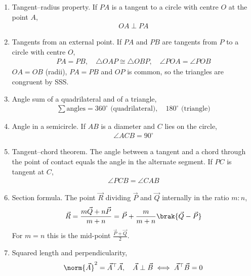 \begin{enumerate}[label=\thesubsection.\arabic*, ref=\thesubsection.\theenumi]
\item Tangent--radius property. If $PA$ is a tangent to a circle with centre $O$ at the point $A$,
\begin{align}
	OA \perp PA \label{eq:CBSE25S2-tangent-radius}
\end{align}
\item Tangents from an external point. If $PA$ and $PB$ are tangents from $P$ to a circle with centre $O$,
\begin{align}
	PA = PB, \quad \triangle OAP \cong \triangle OBP, \quad \angle POA = \angle POB \label{eq:CBSE25S2-tangent-equal}
\end{align}
\solution
$OA = OB$ (radii), $PA = PB$ and $OP$ is common, so the triangles are congruent by SSS. 
\item Angle sum of a quadrilateral and of a triangle,
\begin{align}
	\sum \text{angles} = 360^\circ \text{ (quadrilateral)}, \quad 180^\circ \text{ (triangle)} \label{eq:CBSE25S2-angle-sum}
\end{align}
\item Angle in a semicircle. If $AB$ is a diameter and $C$ lies on the circle,
\begin{align}
	\angle ACB = 90^\circ \label{eq:CBSE25S2-semicircle}
\end{align}
\item Tangent--chord theorem. The angle between a tangent and a chord through the point of contact equals the angle in the alternate segment. If $PC$ is tangent at $C$,
\begin{align}
	\angle PCB = \angle CAB \label{eq:CBSE25S2-tangent-chord}
\end{align}
\item Section formula. The point $\vec{R}$ dividing $\vec{P}$ and $\vec{Q}$ internally in the ratio $m:n$,
\begin{align}
	\vec{R} = \frac{m\vec{Q} + n\vec{P}}{m+n} = \vec{P} + \frac{m}{m+n}\brak{\vec{Q}-\vec{P}} \label{eq:CBSE25S2-section}
\end{align}
For $m = n$ this is the mid-point $\frac{\vec{P}+\vec{Q}}{2}$.
\item Squared length and perpendicularity,
\begin{align}
	\norm{\vec{A}}^2 = \vec{A}^{\top}\vec{A}, \quad \vec{A} \perp \vec{B} \iff \vec{A}^{\top}\vec{B} = 0 \label{eq:CBSE25S2-dot}
\end{align}

\end{enumerate}
